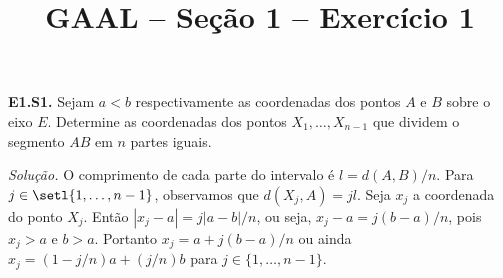 \documentclass[a4paper,11pt]{article}
\title{GAAL -- Seção 1 -- Exercício 1}
\author{\empty}
\date{\empty}
\newcommand\onlyinsubfileone\maketitle
\begin{document}
\onlyinsubfileone

\textbf{E1.S1.}
Sejam $a < b$ respectivamente as coordenadas dos pontos $A$ e $B$ sobre o eixo $E$.
Determine as coordenadas dos pontos $X_1, \dots, X_{n-1}$ que dividem o segmento $AB$ em $n$ partes iguais.

\vspace{\baselineskip}

\emph{Solução.}
O comprimento de cada parte do intervalo é $l = d(A,B)/n$.
Para $j \in \setl{1, \dots, n-1}$, observamos que $d(X_j,A) = j l$.
Seja $x_j$ a coordenada do ponto $X_j$.
Então $|x_j - a| = j|a-b|/n$, ou seja, $x_j - a = j(b-a)/n$, pois $x_j > a$ e $b > a$.
Portanto $x_j = a + j(b-a)/n$ ou ainda $x_j = (1-j/n)a + (j/n)b$ para $j \in \{1, \dots, n-1 \}$.
\end{document}
